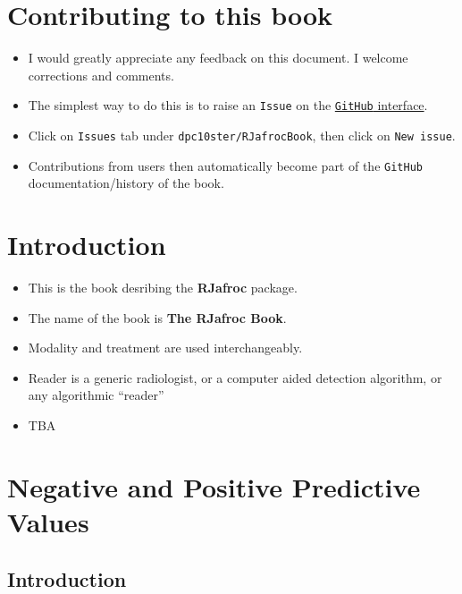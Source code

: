 \documentclass[
]{book}
\providecommand{\tightlist}{%
  \setlength{\itemsep}{0pt}\setlength{\parskip}{0pt}}
\begin{document}
\hypertarget{contributing-to-this-book}{%
\chapter*{Contributing to this book}\label{contributing-to-this-book}}

\begin{itemize}
\tightlist
\item
  I would greatly appreciate any feedback on this document. I welcome corrections and comments.\\
\item
  The simplest way to do this is to raise an \texttt{Issue} on the \href{https://github.com/dpc10ster/RJafrocBook}{\texttt{GitHub} interface}.
\item
  Click on \texttt{Issues} tab under \texttt{dpc10ster/RJafrocBook}, then click on \texttt{New\ issue}.
\item
  Contributions from users then automatically become part of the \texttt{GitHub} documentation/history of the book.
\end{itemize}

\hypertarget{intro}{%
\chapter{Introduction}\label{intro}}

\begin{itemize}
\tightlist
\item
  This is the book desribing the \textbf{RJafroc} package.
\item
  The name of the book is \textbf{The RJafroc Book}.
\item
  Modality and treatment are used interchangeably.
\item
  Reader is a generic radiologist, or a computer aided detection algorithm, or any algorithmic ``reader''
\item
  TBA
\end{itemize}

\hypertarget{NpvPpv}{%
\chapter{Negative and Positive Predictive Values}\label{NpvPpv}}

\hypertarget{introduction}{%
\section{Introduction}\label{introduction}}
\end{document}
